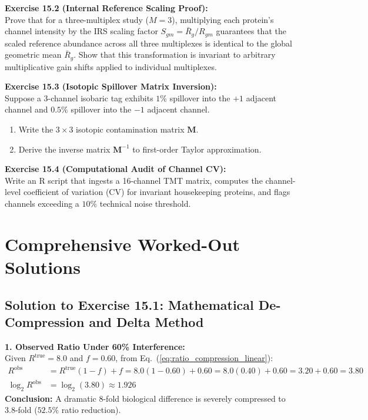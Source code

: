 \documentclass[11pt,oneside]{book}
\begin{document}
\vspace{0.8em}
\noindent\textbf{Exercise 15.2 (Internal Reference Scaling Proof):}\\
Prove that for a three-multiplex study ($M = 3$), multiplying each protein's channel intensity by the IRS scaling factor $S_{gm} = \bar{R}_g / R_{gm}$ guarantees that the scaled reference abundance across all three multiplexes is identical to the global geometric mean $\bar{R}_g$. Show that this transformation is invariant to arbitrary multiplicative gain shifts applied to individual multiplexes.

\vspace{0.8em}
\noindent\textbf{Exercise 15.3 (Isotopic Spillover Matrix Inversion):}\\
Suppose a 3-channel isobaric tag exhibits $1\%$ spillover into the $+1$ adjacent channel and $0.5\%$ spillover into the $-1$ adjacent channel.
\begin{enumerate}
    \item Write the $3 \times 3$ isotopic contamination matrix $\mathbf{M}$.
    \item Derive the inverse matrix $\mathbf{M}^{-1}$ to first-order Taylor approximation.
\end{enumerate}

\vspace{0.8em}
\noindent\textbf{Exercise 15.4 (Computational Audit of Channel CV):}\\
Write an R script that ingests a 16-channel TMT matrix, computes the channel-level coefficient of variation (CV) for invariant housekeeping proteins, and flags channels exceeding a $10\%$ technical noise threshold.

\section{Comprehensive Worked-Out Solutions}

\subsection*{Solution to Exercise 15.1: Mathematical De-Compression and Delta Method}
\textbf{1. Observed Ratio Under 60\% Interference:}\\
Given $R^{\text{true}} = 8.0$ and $f = 0.60$, from Eq.~(\ref{eq:ratio_compression_linear}):
\begin{align*}
R^{\text{obs}} &= R^{\text{true}}(1 - f) + f = 8.0(1 - 0.60) + 0.60 = 8.0(0.40) + 0.60 = 3.20 + 0.60 = 3.80 \\
\log_2 R^{\text{obs}} &= \log_2(3.80) \approx 1.926
\end{align*}
\textbf{Conclusion:} A dramatic 8-fold biological difference is severely compressed to 3.8-fold ($52.5\%$ ratio reduction).
\end{document}
